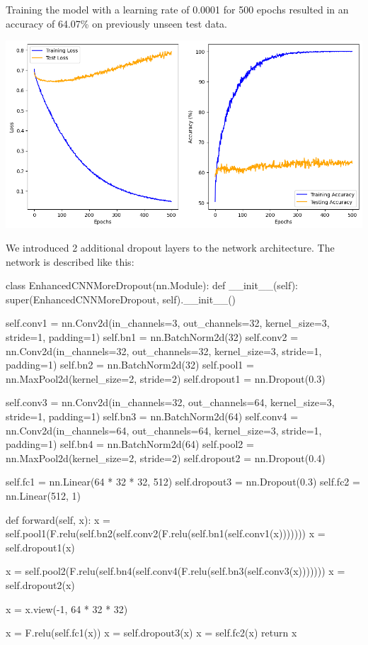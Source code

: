 Training the model with a learning rate of 0.0001 for 500 epochs resulted in an
accuracy of 64.07\% on previously unseen test data.

\includegraphics*[width=\textwidth]{Figures/EnhancedCNN_LR0.0001_500Epochs.png}

We introduced 2 additional dropout layers to the network architecture.
The network is described like this:

\begin{python}
    class EnhancedCNNMoreDropout(nn.Module):
    def __init__(self):
        super(EnhancedCNNMoreDropout, self).__init__()

        self.conv1 = nn.Conv2d(in_channels=3, out_channels=32, kernel_size=3, stride=1, padding=1)
        self.bn1 = nn.BatchNorm2d(32)
        self.conv2 = nn.Conv2d(in_channels=32, out_channels=32, kernel_size=3, stride=1, padding=1)
        self.bn2 = nn.BatchNorm2d(32)
        self.pool1 = nn.MaxPool2d(kernel_size=2, stride=2)
        self.dropout1 = nn.Dropout(0.3)

        self.conv3 = nn.Conv2d(in_channels=32, out_channels=64, kernel_size=3, stride=1, padding=1)
        self.bn3 = nn.BatchNorm2d(64)
        self.conv4 = nn.Conv2d(in_channels=64, out_channels=64, kernel_size=3, stride=1, padding=1)
        self.bn4 = nn.BatchNorm2d(64)
        self.pool2 = nn.MaxPool2d(kernel_size=2, stride=2)
        self.dropout2 = nn.Dropout(0.4)

        self.fc1 = nn.Linear(64 * 32 * 32, 512)
        self.dropout3 = nn.Dropout(0.3)
        self.fc2 = nn.Linear(512, 1)

    def forward(self, x):
        x = self.pool1(F.relu(self.bn2(self.conv2(F.relu(self.bn1(self.conv1(x)))))))
        x = self.dropout1(x)

        x = self.pool2(F.relu(self.bn4(self.conv4(F.relu(self.bn3(self.conv3(x)))))))
        x = self.dropout2(x)

        x = x.view(-1, 64 * 32 * 32)

        x = F.relu(self.fc1(x))
        x = self.dropout3(x)
        x = self.fc2(x)
        return x
\end{python}

